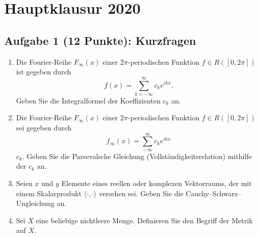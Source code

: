 \section{Hauptklausur 2020}

\subsection*{Aufgabe 1 (12 Punkte): Kurzfragen}
\begin{enumerate}
\item Die Fourier-Reihe $F_\infty(x)$ einer $2\pi$-periodischen Funktion $f\in R([0,2\pi])$ ist gegeben durch
\[
f(x) = \sum_{k=-\infty}^{\infty} c_k e^{ikx}.
\]
Geben Sie die Integralformel der Koeffizienten $c_k$ an.\\

\item Die Fourier-Reihe $F_\infty(x)$ einer $2\pi$-periodischen Funktion $f\in R([0,2\pi])$ sei gegeben durch
$$
f_\infty(x) = \sum_{-\infty}^\infty c_k e^{ikx}
$$
$c_k$. Geben Sie die Parsevalsche Gleichung (Vollständigkeitsrelation) mithilfe der $c_k$ an.\\

\item Seien $x$ und $y$ Elemente eines reellen oder komplexen Vektorraums, der mit einem Skalarprodukt $\langle\cdot,\cdot\rangle$ versehen sei. Geben Sie die Cauchy–Schwarz–Ungleichung an.\\

\item Sei $X$ eine beliebige nichtleere Menge. Definieren Sie den Begriff der Metrik auf $X$.\\


\end{enumerate}

